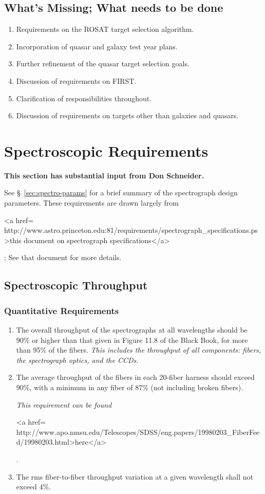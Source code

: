 \subsection{What's Missing; What needs to be done}
\begin{enumerate}
\item Requirements on the ROSAT target selection algorithm.
\item Incorporation of quasar and galaxy test year plans. 
\item Further refinement of the quasar target selection goals. 
\item Discussion of requirements on FIRST. 
\item Clarification of responsibilities throughout. 
\item Discussion of requirements on targets other than galaxies and
quasars. 
\end{enumerate}


\section{Spectroscopic Requirements}
{\bf This section has substantial input from Don Schneider.} 

See \S~\ref{sec:spectro-params} for a brief summary of the spectrograph
design parameters. These requirements are drawn
largely from 
\begin{rawhtml}
<a href=
http://www.astro.princeton.edu:81/requirements/spectrograph_specifications.ps>this document on spectrograph
specifications</a>\end{rawhtml};
See that document for more details. 

\label{sec:spectro}
\subsection{Spectroscopic Throughput}

\subsubsection{Quantitative Requirements}
\begin{enumerate} 
\item The overall throughput of the spectrographs at all wavelengths
should be 90\% or higher than that given in Figure 11.8 of the Black
Book, for more than 95\% of the fibers.  {\it This includes the
throughput of all components: fibers, the spectrograph optics, and the
CCDs.}

\item The average throughput of the fibers in each 20-fiber harness
 should exceed 90\%, with a minimum in any fiber of 87\% (not
including broken fibers). {\it
This requirement can be found 
\begin{rawhtml}
<a href=
http://www.apo.nmsu.edu/Telescopes/SDSS/eng.papers/19980203_FiberFeed/19980203.html>here</a>\end{rawhtml}}. 

\item The rms fiber-to-fiber throughput variation at a given wavelength
shall not exceed 4\%. 

\end{enumerate}

